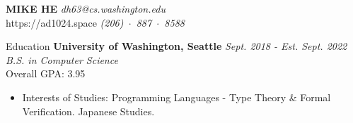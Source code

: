 \documentclass{resume}
\begin{document}
\MakeUppercase{\Large{\textbf{Mike He}}} \hfill {\em{dh63@cs.washington.edu}}\\
\vspace{-5pt}
https://ad1024.space \hfill{\em (206)~$\cdot$~887~$\cdot$~8588}\\


	\begin{rSection}{Education}
	{\bf University of Washington, Seattle} \hfill {\em Sept. 2018 - Est. Sept. 2022} \\
	\textit{B.S. in Computer Science} \\
	Overall GPA: 3.95
	\vspace{-5pt}
        \begin{itemize}[leftmargin=*]
            \setlength{\itemsep}{1pt}
            \setlength{\parskip}{0pt}
            \setlength{\parsep}{0pt}
            \item Interests of Studies: Programming Languages - Type Theory \& Formal Verification. Japanese Studies.
        \end{itemize}
	\end{rSection}
	\vspace{-5pt}
\end{document}

